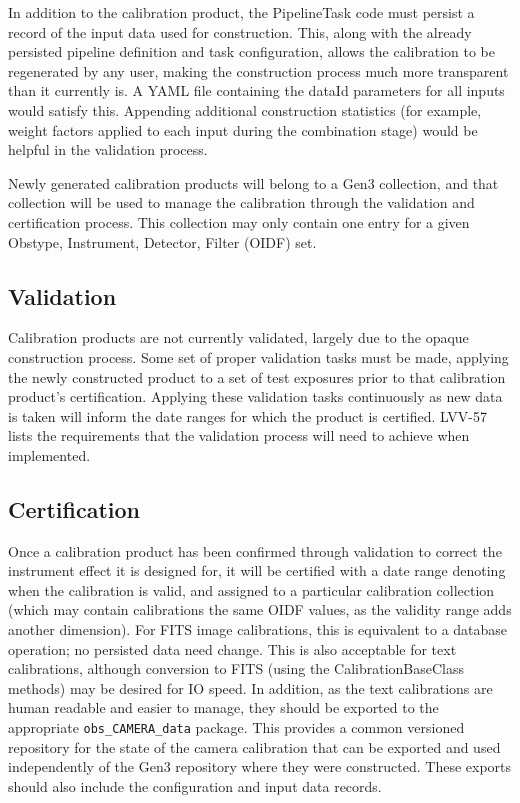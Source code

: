 \documentclass[DM,authoryear,toc]{lsstdoc}
\begin{document}
In addition to the calibration product, the PipelineTask code must
persist a record of the input data used for construction.  This, along
with the already persisted pipeline definition and task configuration,
allows the calibration to be regenerated by any user, making the
construction process much more transparent than it currently is.  A
YAML file containing the dataId parameters for all inputs would
satisfy this.  Appending additional construction statistics (for
example, weight factors applied to each input during the combination
stage) would be helpful in the validation process.

Newly generated calibration products will belong to a Gen3 collection,
and that collection will be used to manage the calibration through the
validation and certification process.  This collection may only
contain one entry for a given Obstype, Instrument, Detector, Filter
(OIDF) set.

\subsection{Validation}

Calibration products are not currently validated, largely due to the
opaque construction process.  Some set of proper validation tasks must
be made, applying the newly constructed product to a set of test
exposures prior to that calibration product's certification.  Applying
these validation tasks continuously as new data is taken will inform
the date ranges for which the product is certified.  LVV-57
 lists the requirements that the validation process
will need to achieve when implemented.

\subsection{Certification}

Once a calibration product has been confirmed through validation to
correct the instrument effect it is designed for, it will be certified
with a date range denoting when the calibration is valid, and assigned
to a particular calibration collection (which may contain calibrations
the same OIDF values, as the validity range adds another dimension).
For FITS image calibrations, this is equivalent to a database
operation; no persisted data need change.  This is also acceptable for
text calibrations, although conversion to FITS (using the
CalibrationBaseClass methods) may be desired for IO speed. In
addition, as the text calibrations are human readable and easier to
manage, they should be exported to the appropriate \verb|obs_CAMERA_data|
package.  This provides a common versioned repository for the state of
the camera calibration that can be exported and used independently of
the Gen3 repository where they were constructed.  These exports should
also include the configuration and input data records.
\end{document}
